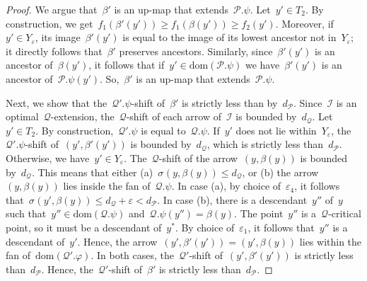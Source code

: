 \documentclass[a4paper,UKenglish, autoref, thm-restate, cleveref]{lipics-v2021}
\newcommand{\dom}{\mathrm{dom}}
\newcommand{\shift}[1]{\sigma_{#1}}
\newcommand{\resdist}[1]{d_{#1}}
\newcommand{\eps}{\varepsilon}
\renewcommand{\phi}{\varphi}
\newcommand{\I}{\mathcal{I}}
\renewcommand{\P}{\mathcal{P}}
\newcommand{\Q}{\mathcal{Q}}
\begin{document}
\begin{proof}
    We argue that~$\beta'$ is an up-map that extends~$\P.\psi$.
    Let~$y' \in T_2$.
    By construction, we get~$f_1(\beta'(y')) \ge f_1(\beta(y')) \ge f_2(y')$.
    Moreover, if~$y' \in Y_\eps$, its image~$\beta'(y')$ is equal to the image of its lowest ancestor not in~$Y_\eps$; it directly follows that~$\beta'$ preserves ancestors.
    Similarly, since~$\beta'(y')$ is an ancestor of~$\beta(y')$, it follows that if~$y' \in \dom(\P.\psi)$ we have~$\beta'(y')$ is an ancestor of~$\P.\psi(y')$.
    So,~$\beta'$ is an up-map that extends~$\P.\psi$.
    
    Next, we show that the~$\Q'.\psi$-shift of~$\beta'$ is strictly less than by~$\resdist{\P}$.
    Since~$\I$ is an optimal~$\Q$-extension, the~$\Q$-shift of each arrow of~$\I$ is bounded by~$\resdist{\Q}$.
    Let~$y' \in T_2$.
    By construction,~$\Q'.\psi$ is equal to~$\Q.\psi$.
    If~$y'$ does not lie within~$Y_\eps$, the~$\Q'.\psi$-shift of~$(y', \beta'(y'))$ is bounded by~$\resdist{\Q}$, which is strictly less than~$\resdist{\P}$.
    Otherwise, we have~$y' \in Y_\eps$.
    The~$\Q$-shift of the arrow~$(y, \beta(y))$ is bounded by~$\resdist{\Q}$.
    This means that either (a)~$\shift{}(y, \beta(y)) \le \resdist{\Q}$, or (b) the arrow~$(y, \beta(y))$ lies inside the fan of~$\Q.\psi$.
    In case (a), by choice of~$\eps_4$, it follows that~$\shift{}(y', \beta(y)) \le \resdist{\Q} + \eps < \resdist{\P}$.
    In case (b), there is a descendant~$y''$ of~$y$ such that~$y'' \in \dom(\Q.\psi)$ and~$\Q.\psi(y'') = \beta(y)$.
    The point~$y''$ is a~$\Q$-critical point, so it must be a descendant of~$y^*$.
    By choice of~$\eps_1$, it follows that~$y''$ is a descendant of~$y'$.
    Hence, the arrow~$(y', \beta'(y')) = (y', \beta(y))$ lies within the fan of~$\dom(\Q'.\phi)$.
    In both cases, the~$\Q'$-shift of~$(y', \beta'(y'))$ is strictly less than~$\resdist{\P}$.
    Hence, the~$\Q'$-shift of~$\beta'$ is strictly less than~$\resdist{\P}$.


\end{proof}
\end{document}
